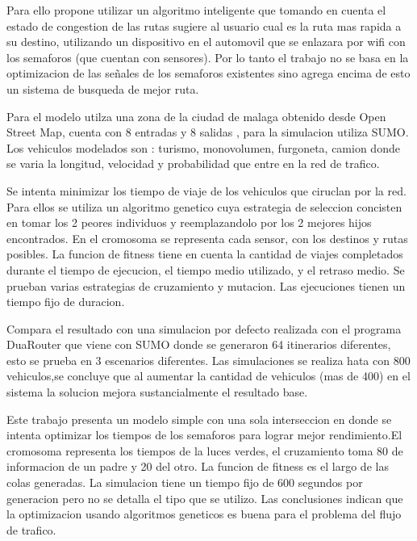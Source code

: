 \begin{itemize}
\begin{item}
Para ello propone utilizar un algoritmo inteligente que tomando en cuenta el estado de congestion de las rutas sugiere al usuario cual es la ruta mas rapida a su destino, utilizando un dispositivo en el automovil que se enlazara por wifi con los semaforos (que cuentan con sensores). Por lo tanto el trabajo no se basa en la optimizacion de las señales de los semaforos existentes sino agrega encima de esto un sistema de busqueda de mejor ruta.

Para el modelo utilza una zona  de la ciudad de malaga obtenido desde Open Street Map, cuenta con 8 entradas y 8 salidas , para la simulacion utiliza SUMO. Los vehiculos modelados son : turismo, monovolumen, furgoneta, camion donde se varia la longitud, velocidad y probabilidad que entre en la red de trafico.

Se intenta minimizar los tiempo de viaje de los vehiculos que ciruclan por la red. Para ellos se utiliza un algoritmo genetico cuya estrategia de seleccion concisten en tomar los 2 peores individuos y reemplazandolo por los 2 mejores hijos encontrados. En el cromosoma se representa cada sensor, con los destinos y rutas posibles. La funcion de fitness tiene en cuenta la cantidad de viajes completados durante el tiempo de ejecucion, el tiempo medio utilizado, y el retraso medio. Se prueban varias estrategias de cruzamiento y mutacion. Las ejecuciones tienen un tiempo fijo de duracion.


Compara el resultado con una simulacion por defecto realizada con el programa DuaRouter que viene con SUMO donde se generaron 64 itinerarios diferentes, esto se prueba en 3 escenarios diferentes. Las simulaciones se realiza hata con 800 vehiculos,se concluye que al aumentar la cantidad de vehiculos (mas de 400) en el sistema la solucion mejora sustancialmente el resultado base.

	\end{item}	
	
	
	\begin{item}
Este trabajo presenta un modelo simple con una sola interseccion en donde se intenta optimizar los tiempos de los semaforos para lograr mejor rendimiento.El cromosoma representa los tiempos de la luces verdes, el cruzamiento toma 80 de informacion de un padre y 20 del otro. La funcion de fitness es el largo de las colas generadas. La simulacion tiene un tiempo fijo de 600 segundos por generacion pero no se detalla el tipo que se utilizo. Las conclusiones indican que la optimizacion usando algoritmos geneticos  es buena para el problema del flujo de trafico.	
	\end{item}	



\end{itemize}
